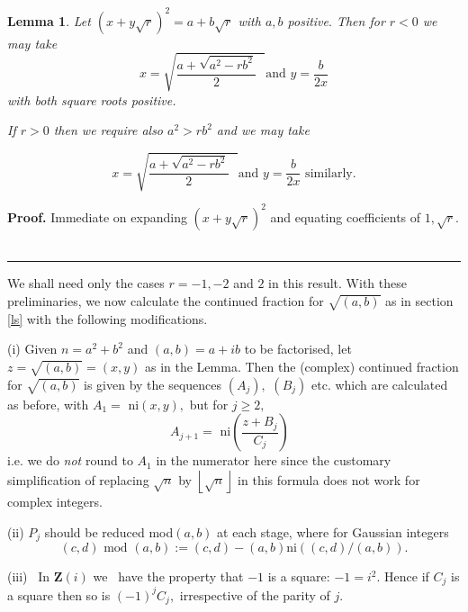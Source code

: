 \documentclass[12pt]{article}
\newtheorem{lemma}[theorem]{Lemma}
\newenvironment{proof}[1][Proof]{\textbf{#1.} }{\ \rule{0.5em}{0.5em}}
\begin{document}
\begin{lemma}
Let $\left( x+y\sqrt{r}\right) ^{2}=a+b\sqrt{r}$ with $a,b$ positive$.$ Then
for $r<0$ we may take 
\begin{equation*}
x=\sqrt{\frac{a+\sqrt{a^{2}-rb^{2}}}{2}\text{ }}\text{and }y=\frac{b}{2x}
\end{equation*}%
with both square roots positive.

If $r>0$ then we require also $a^{2}>rb^{2}$ and we may take

\begin{equation*}
x=\sqrt{\frac{a+\sqrt{a^{2}-rb^{2}}}{2}\text{ }}\text{and }y=\frac{b}{2x}%
\text{ similarly.}
\end{equation*}
\end{lemma}

\begin{proof}
Immediate on expanding $\left( x+y\sqrt{r}\right) ^{2}$ and equating
coefficients of $1,\sqrt{r}.$
\end{proof}

We shall need only the cases $r=-1,-2$ and $2$ in this result. With these
preliminaries, we now calculate the continued fraction for $\sqrt{\left(
a,b\right) }$ as in section \ref{ls} with the following modifications.

(i) Given $n=a^{2}+b^{2}$ and $\left( a,b\right) =a+ib$ to be factorised,
let $z=\sqrt{\left( a,b\right) }=\left( x,y\right) $ as in the Lemma$.$ Then
the (complex) continued fraction for $\sqrt{\left( a,b\right) }$ is given by
the sequences $\left( A_{j}\right) ,$ $\left( B_{j}\right) $ etc. which are
calculated as before, with $A_{1}=$ ni$\left( x,y\right) ,$ but for $j\geq
2, $ 
\begin{equation*}
A_{j+1}=\text{ ni}\left( \frac{z+B_{j}}{C_{j}}\right) \text{ }
\end{equation*}%
i.e. we do \emph{not} round to $A_{1}$ in the numerator here since the
customary simplification of replacing $\sqrt{n}$ by $\left\lfloor \sqrt{n}%
\right\rfloor $ in this formula does not work for complex integers.

(ii) $P_{j}$ should be reduced mod$\left( a,b\right) $ at each stage, where
for Gaussian integers 
\begin{equation*}
\left( c,d\right) \text{ mod }\left( a,b\right) :=\left( c,d\right) -\left(
a,b\right) \text{ni}\left( \left( c,d\right) /\left( a,b\right) \right) .
\end{equation*}

(iii) \ In $\mathbf{Z}\left( i\right) $ we \ have the property that $-1$ is
a square: $-1=i^{2}.$ Hence if $C_{j}$ is a square then so is $\left(
-1\right) ^{j}C_{j},$ irrespective of the parity of $j.$
\end{document}
